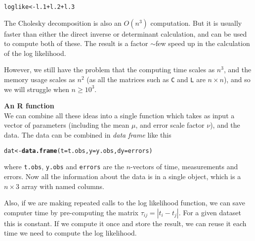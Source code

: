 \documentclass[a4paper, 11pt, amsmath, graphicx]{article}\usepackage[]{graphicx}\usepackage[]{color}
\makeatletter
\newcommand{\hlopt}[1]{\textcolor[rgb]{0,0,0}{#1}}%
\newcommand{\hlstd}[1]{\textcolor[rgb]{0.345,0.345,0.345}{#1}}%
\newcommand{\hlkwb}[1]{\textcolor[rgb]{0.69,0.353,0.396}{#1}}%
\newcommand{\hlkwc}[1]{\textcolor[rgb]{0.333,0.667,0.333}{#1}}%
\newcommand{\hlkwd}[1]{\textcolor[rgb]{0.737,0.353,0.396}{\textbf{#1}}}%
\newenvironment{kframe}{%
 \def\at@end@of@kframe{}%
 \ifinner\ifhmode%
  \def\at@end@of@kframe{\end{minipage}}%
  \begin{minipage}{\columnwidth}%
 \fi\fi%
 \def\FrameCommand##1{\hskip\@totalleftmargin \hskip-\fboxsep
 \colorbox{shadecolor}{##1}\hskip-\fboxsep
     \hskip-\linewidth \hskip-\@totalleftmargin \hskip\columnwidth}%
 \MakeFramed {\advance\hsize-\width
   \@totalleftmargin\z@ \linewidth\hsize
   \@setminipage}}%
 {\par\unskip\endMakeFramed%
 \at@end@of@kframe}
\newenvironment{knitrout}{}{} %
\makeatother
\begin{document}
\begin{knitrout}
\color{fgcolor}\begin{kframe}
\begin{alltt}
   \hlstd{loglike} \hlkwb{<-} \hlstd{l.1} \hlopt{+} \hlstd{l.2} \hlopt{+} \hlstd{l.3}
\end{alltt}
\end{kframe}
\end{knitrout}

The Cholesky decomposition is also an $O(n^3)$ computation. But it is usually faster than either the direct inverse or determinant calculation, and can be used to compute both of these. The result is a factor $\sim$few speed up in the calculation of the log likelihood. 

However, we still have the problem that the computing time scales as $n^3$, and the memory usage scales as $n^2$ (as all the matrices such as {\tt C} and {\tt L} are $n \times n$), and so we will struggle when $n \ge 10^3$.

\vspace{0.4cm}
\textbf{An R function}
\\

We can combine all these ideas into a single function which takes as input a vector of parameters (including the mean $\mu$, and error scale factor $\nu$), and the data. The data can be combined in \emph{data frame} like this

\begin{knitrout}
\color{fgcolor}\begin{kframe}
\begin{alltt}
  \hlstd{dat} \hlkwb{<-} \hlkwd{data.frame}\hlstd{(}\hlkwc{t} \hlstd{= t.obs,} \hlkwc{y} \hlstd{= y.obs,} \hlkwc{dy} \hlstd{= errors)}
\end{alltt}
\end{kframe}
\end{knitrout}

where {\tt t.obs}, {\tt y.obs} and {\tt errors} are the $n$-vectors of time, measurements and errors. Now all the information about the data is in a single object, which is a $n \times 3$ array with named columns.

Also, if we are making repeated calls to the log likelihood function, we can save computer time by pre-computing the matrix $\tau_{ij} = |t_i - t_j|$. For a given dataset this is constant. If we compute it once and store the result, we can reuse it each time we need to compute the log likelihood.
\end{document}

